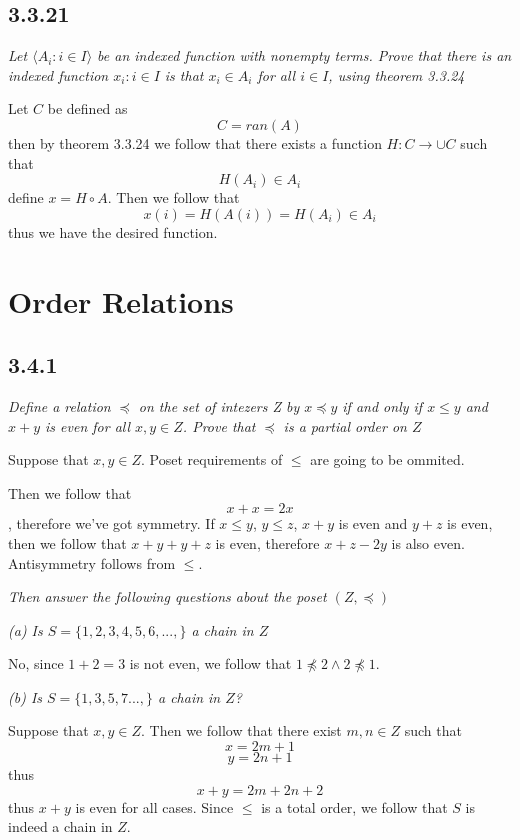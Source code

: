 \documentclass[11pt,oneside,titlepage]{book}
\newcommand{\eangle}[1]{\langle #1 \rangle}
\begin{document}
\subsection*{3.3.21}

\textit{Let $\eangle{A_i: i \in I}$ be an indexed function with nonempty terms. Prove that there
  is an indexed function ${x_i: i \in I}$ is that $x_i \in A_i$ for all $i \in I$, using
  theorem 3.3.24}

Let $C$ be defined as
$$C = ran(A)$$
then by theorem 3.3.24 we follow that there exists a function $H: C \to \cup C$ such that
$$H(A_i) \in A_i$$
define $x = H \circ A $. Then we follow that
$$x(i) = H(A(i)) = H(A_i) \in A_i$$
thus we have the desired function.

\section{Order Relations}

\subsection*{3.4.1}

\textit{Define a relation $\preceq$ on the set of intezers Z by $x \preceq y$ if and only if
  $x \leq y$ and $x + y$ is even for all $x, y \in Z$. Prove that $\preceq$ is a partial order
  on $Z$}

Suppose that $x, y \in Z$. Poset requirements of $\leq$ are going to be ommited.

Then we follow that $$x + x = 2x$$, therefore we've got symmetry.
If $x \leq y$, $y \leq z$, $x + y$ is even and $y + z$ is even, then we follow that
$x + y + y + z$ is even, therefore $x + z - 2y$ is also even.
Antisymmetry follows from $\leq$.

\textit{Then answer the following questions about the poset $(Z, \preceq)$}

\textit{(a) Is $S = \{1, 2, 3, 4, 5, 6, ..., \}$ a chain in $Z$}

No, since $1 + 2 = 3$ is not even, we follow that $1 \not \preceq 2 \land 2 \not \preceq 1$.

\textit{(b) Is $S = \{1, 3, 5, 7 ...,\}$ a chain in $Z$?}

Suppose that $x, y \in Z$. Then we follow that there exist $m, n \in Z$ such that
$$x = 2m + 1$$
$$y = 2n + 1$$
thus
$$x + y = 2m + 2n + 2$$
thus $x + y$ is even for all cases. Since $\leq$ is a total order, we follow that $S$ is
indeed a chain in $Z$.
\end{document}
